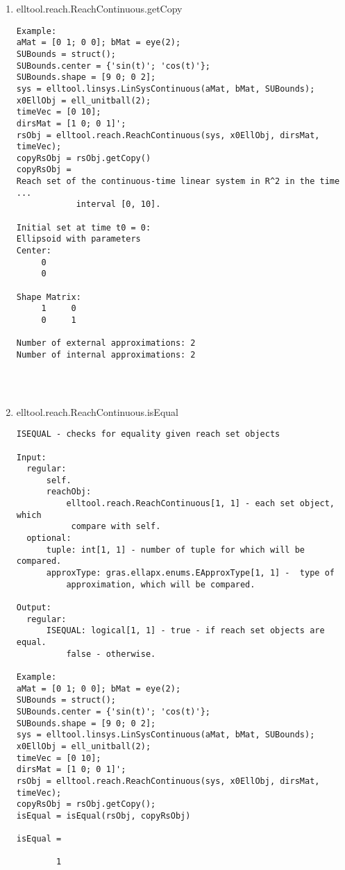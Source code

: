 \begin{enumerate}
\begin{lstlisting}
\end{lstlisting}
\fontfamily{\familydefault}
\selectfont
\item {elltool.reach.ReachContinuous.getCopy}
\selectfont
\begin{lstlisting}
Example:
aMat = [0 1; 0 0]; bMat = eye(2);
SUBounds = struct();
SUBounds.center = {'sin(t)'; 'cos(t)'};
SUBounds.shape = [9 0; 0 2];
sys = elltool.linsys.LinSysContinuous(aMat, bMat, SUBounds);
x0EllObj = ell_unitball(2);
timeVec = [0 10];
dirsMat = [1 0; 0 1]';
rsObj = elltool.reach.ReachContinuous(sys, x0EllObj, dirsMat, timeVec);
copyRsObj = rsObj.getCopy()
copyRsObj =
Reach set of the continuous-time linear system in R^2 in the time ...
            interval [0, 10].

Initial set at time t0 = 0:
Ellipsoid with parameters
Center:
     0
     0

Shape Matrix:
     1     0
     0     1

Number of external approximations: 2
Number of internal approximations: 2




\end{lstlisting}
\fontfamily{\familydefault}
\selectfont
\item {elltool.reach.ReachContinuous.isEqual}
\selectfont
\begin{lstlisting}
ISEQUAL - checks for equality given reach set objects

Input:
  regular:
      self.
      reachObj:
          elltool.reach.ReachContinuous[1, 1] - each set object, which
           compare with self.
  optional:
      tuple: int[1, 1] - number of tuple for which will be compared.
      approxType: gras.ellapx.enums.EApproxType[1, 1] -  type of
          approximation, which will be compared.

Output:
  regular:
      ISEQUAL: logical[1, 1] - true - if reach set objects are equal.
          false - otherwise.

Example:
aMat = [0 1; 0 0]; bMat = eye(2);
SUBounds = struct();
SUBounds.center = {'sin(t)'; 'cos(t)'};
SUBounds.shape = [9 0; 0 2];
sys = elltool.linsys.LinSysContinuous(aMat, bMat, SUBounds);
x0EllObj = ell_unitball(2);
timeVec = [0 10];
dirsMat = [1 0; 0 1]';
rsObj = elltool.reach.ReachContinuous(sys, x0EllObj, dirsMat, timeVec);
copyRsObj = rsObj.getCopy();
isEqual = isEqual(rsObj, copyRsObj)

isEqual =

        1




\end{lstlisting}
\end{enumerate}
